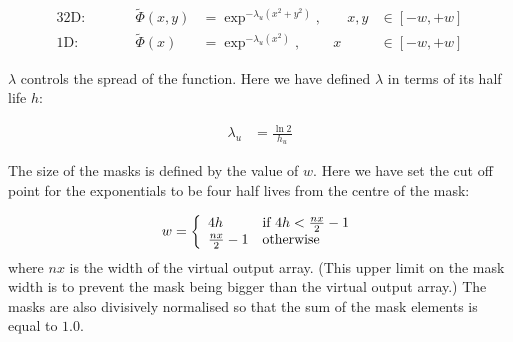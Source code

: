 \documentclass[a4paper]{article}
\newcommand{\skernel}{\tilde{\Phi}}
\begin{document}
\begin{alignat*}{3}
\text{2D:}&& \qquad  \skernel(x,y) &= \exp ^{- \lambda_u (x^2 + y^2)
  },& \quad 
x,y &\in [-w,+w]\\
\text{1D:}&& \qquad  \skernel(x) &= \exp^{- \lambda_u (x^2)},&  x &\in [-w,+w]
\end{alignat*}

$\lambda$ controls the spread of the function.  Here we have defined
$\lambda$ in terms of its half life $h$:

\begin{align*}
\lambda_u &= \frac{\ln 2}{h_u}
\end{align*}

The size of the masks is defined by the value of $w$.  Here we have
set the cut off point for the exponentials to be four half lives from
the centre of the mask:

\[ w = \left\{ \begin{array}{ll}
    4h & \text{if $ 4h < \frac{nx}{2} - 1$} \\
    \frac{nx}{2} - 1 & \text{otherwise}
\end{array} \right. \]
where $nx$ is the width of the virtual output array.  (This upper
limit on the mask width is to prevent the mask being bigger than the
virtual output array.)
The masks are also divisively normalised so that the sum of the mask
elements is equal to $1.0$.

  





\end{document}
